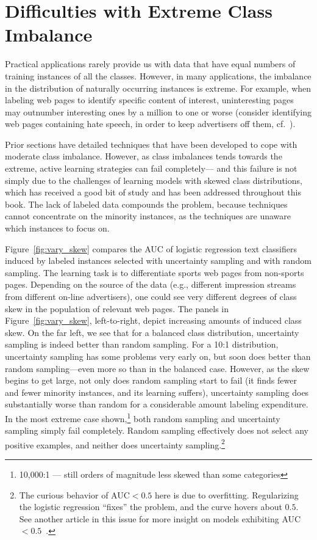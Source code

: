 \section{Difficulties with Extreme Class Imbalance}
\label{sec:skew}
Practical applications rarely provide us with data that have equal numbers of training instances of all the classes.  However, in many applications, the imbalance in the distribution of naturally occurring instances is extreme.  For example, when labeling web pages to identify specific content of interest, uninteresting pages may outnumber interesting ones by a million to one or worse (consider identifying web pages containing hate speech, in order to keep advertisers off them, cf.~\cite{attprovkdd2010}).

Prior sections have detailed techniques that have been developed to cope with moderate class imbalance. However, as class imbalances tends towards the extreme, active learning strategies can fail completely--- and this failure is not simply due to the challenges of learning models with skewed class distributions, which has received a good bit of study and has been addressed throughout this book.  The lack of labeled data compounds the problem, because techniques cannot concentrate on the minority instances, as the techniques are unaware which instances to focus on.

Figure~\ref{fig:vary_skew} compares the AUC of logistic regression text classifiers induced by labeled instances selected with uncertainty sampling and with random sampling.  The learning task is to differentiate sports web pages from non-sports pages.  Depending on the source of the data (e.g., different impression streams from different on-line advertisers), one could see very different degrees of class skew in the population of relevant web pages.
The panels in Figure~\ref{fig:vary_skew}, left-to-right, depict increasing amounts of induced class skew.  On the far left, we see that for a balanced class distribution, uncertainty sampling is indeed better than random sampling.  For a 10:1 distribution, uncertainty sampling has some problems very early on, but soon does better than random sampling---even more so than in the balanced case.  However, as the skew begins to get large, not only does random sampling start to fail (it finds fewer and fewer minority instances, and its learning suffers), uncertainty sampling does substantially worse than random for a considerable amount labeling expenditure.  In the most extreme case shown,\footnote{10,000:1 --- still orders of magnitude less skewed than some categories} both random sampling and uncertainty sampling simply fail completely.  Random sampling effectively does not select any positive examples, and neither does uncertainty sampling.\footnote{The curious behavior of AUC$<0.5$ here is due to overfitting.  Regularizing the logistic regression ``fixes'' the problem, and the curve hovers about $0.5$.  See another article in this issue for more insight on models exhibiting AUC$<0.5$~\cite{claudia10xvalid}.}

